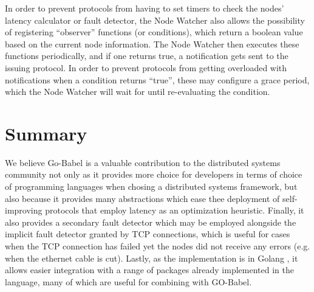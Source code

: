 In order to prevent protocols from having to set timers to check the nodes' latency calculator or fault detector, the Node Watcher also allows the possibility of registering ``observer'' functions (or conditions), which return a boolean value based on the current node information. The Node Watcher then executes these functions periodically, and if one returns true, a notification gets sent to the issuing protocol. In order to prevent protocols from getting overloaded with notifications when a condition returns ``true'', these may configure a grace period, which the Node Watcher will wait for until re-evaluating the condition.

\section{Summary}

We believe Go-Babel is a valuable contribution to the distributed systems community not only as it provides more choice for developers in terms of choice of programming languages when chosing a distributed systems framework, but also because it provides many abstractions which ease thee deployment of self-improving protocols that employ latency as an optimization heuristic. Finally, it also provides a secondary fault detector which may be employed alongside the implicit fault detector granted by TCP connections, which is useful for cases when the TCP connection has failed yet the nodes did not receive any errors (e.g. when the ethernet cable is cut). Lastly, as the implementation is in Golang , it allows easier integration with a range of packages already implemented in the language, many of which are useful for combining with GO-Babel. 
